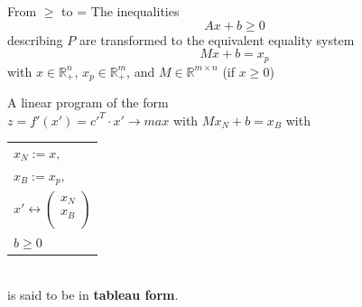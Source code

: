 \documentclass[10pt]{beamer}
\begin{document}
\begin{frame}{From $\geq$ to =}
	The inequalities 
	\begin{equation*}
		Ax + b \geq 0
	\end{equation*}
	describing $P$ are transformed to the equivalent equality system
	\begin{equation*}
		Mx + b = x_p
	\end{equation*}
	with $x\in \mathbb{R}_+^n$, $ x_p \in \mathbb{R}_+^m$, and $M\in \mathbb{R}^{m\times n}$ (if $x\geq 0$)\\
	\pause
	\begin{definition}
		A linear program of the form \\
		\vspace{0.25cm}
		$ z = f'(x') = c'^T \cdot x' \rightarrow max$ 
		\hspace{0.5cm} with $Mx_N+b=x_B$ with \begin{tabular}{l}
			$x_N:=x,$ \\
			$x_B:=x_p,$\\ $x'\leftrightarrow\begin{pmatrix}
			x_N\\x_B\\
			\end{pmatrix} $\\
			$b\geq 0$
		\end{tabular}  \\
		\vspace{0.15cm}
		is said to be in \textbf{tableau form}.\\
	\end{definition}
\end{frame}
\end{document}
